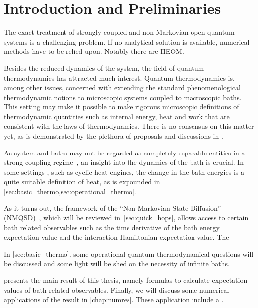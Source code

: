 \chapter{Introduction and Preliminaries}
\label{chap:intro}

The exact treatment of strongly coupled and non Markovian open quantum
systems is a challenging problem.  If no analytical solution is
available, numerical methods have to be relied upon. Notably there are
HEOM.

Besides the reduced dynamics of the system, the field of quantum
thermodynamics has attracted much interest. Quantum thermodynamics is,
among other issues, concerned with extending the standard
phenomenological thermodynamic notions to microscopic systems coupled
to macroscopic baths. This setting may make it possible to make
rigorous microscopic definitions of thermodynamic quantities such as
internal energy, heat and work that are consistent with the laws of
thermodynamics. There is no consensus on this matter yet, as is
demonstrated by the plethora of proposals and discussions in
\cite{Rivas2019Oct,Talkner2020Oct,Motz2018Nov,Wiedmann2020Mar,Senior2020Feb,Kato2015Aug,Kato2016Dec,Strasberg2021Aug,Talkner2016Aug,Bera2021Feb,Bera2021Jun,Esposito2015Dec}.

As system and baths may not be regarded as completely separable
entities in a strong coupling
regime~\cite{Rivas2019Oct,Esposito2015Dec}, an insight into the
dynamics of the bath is crucial. In some settings
\cite{Kato2016Dec,Lobejko2021Feb, Strasberg2021Aug}, such as cyclic
heat engines, the change in the bath energies is a quite suitable
definition of heat, as is expounded in
\cref{sec:basic_thermo,sec:operational_thermo}.

As it turns out, the framework of the ``Non Markovian State
Diffusion'' (NMQSD)~\cite{Diosi1998Mar}, which will be reviewed
in~\cref{sec:quick_hops}, allows access to certain bath related
observables such as the time derivative of the bath energy expectation
value and the interaction Hamiltonian expectation value. The

In \cref{sec:basic_thermo}, some operational quantum thermodynamical
questions will be discussed and some light will be shed on the
necessity of infinite baths.

 presents the main result of this thesis, namely
formulas to calculate expectation values of bath related
observables. Finally, we will discuss some numerical applications of
the result in \cref{chap:numres}. These application include a
.

